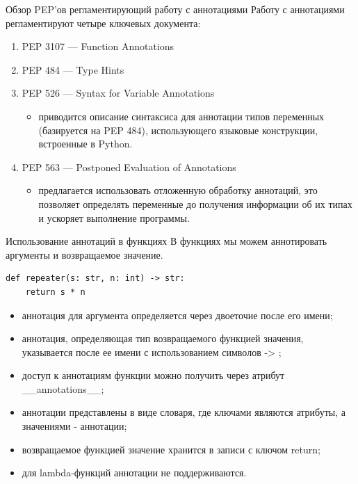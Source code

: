 \documentclass[xcolor=table]{beamer}
\begin{document}
\begin{frame}[fragile]{ Обзор PEP’ов регламентирующий работу с аннотациями}
	Работу с аннотациями регламентируют четыре ключевых документа: 
	\begin{enumerate}
		\item PEP 3107 — Function Annotations
		\item PEP 484 — Type Hints
		\item PEP 526 — Syntax for Variable Annotations
		\begin{itemize}
			\item приводится описание синтаксиса для аннотации типов переменных (базируется на PEP 484), использующего языковые конструкции, встроенные в Python.
		\end{itemize}				
		\item PEP 563 — Postponed Evaluation of Annotations
		\begin{itemize}
			\item предлагается использовать отложенную обработку аннотаций, это позволяет определять переменные до получения информации об их типах и ускоряет выполнение программы.
		\end{itemize}		
	\end{enumerate}
\end{frame}

\begin{frame}[fragile]{Использование аннотаций в функциях}
	В функциях мы можем аннотировать аргументы и возвращаемое значение.
	\begin{verbatim}
def repeater(s: str, n: int) -> str:
	return s * n
	\end{verbatim}
	\begin{itemize}
		\item аннотация для аргумента определяется через двоеточие после его имени;
		\item аннотация, определяющая тип возвращаемого функцией значения, указывается после ее имени с использованием символов ->	;
		\item доступ к аннотациям функции можно получить через атрибут \_\_annotations\_\_; 
		\item аннотации представлены в виде словаря, где ключами являются атрибуты, а значениями - аннотации; 
		\item возвращаемое функцией значение хранится в записи с ключом return;
		\item для lambda-функций аннотации не поддерживаются.
	\end{itemize}
\end{frame}
\end{document}
